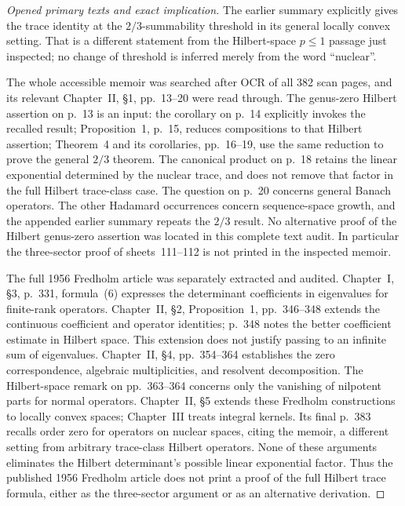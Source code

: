 \begin{proof}[Opened primary texts and exact implication]
The earlier summary \cite[Chapter II, no.~6, Theorem 8 and Corollary 2,
pp.~107--108]{Grothendieck1952Summary} explicitly gives the trace identity
at the $2/3$-summability threshold in its general locally convex setting.
That is a different statement from the Hilbert-space $p\leq1$ passage
just inspected; no change of threshold is inferred merely from the word
``nuclear''.

The whole accessible memoir was searched after OCR of all 382 scan pages,
and its relevant Chapter~II, \S1, pp.~13--20 were read through. The
genus-zero Hilbert assertion on p.~13 is an input: the corollary on p.~14
explicitly invokes the recalled result; Proposition~1, p.~15, reduces
compositions to that Hilbert assertion; Theorem~4 and its corollaries,
pp.~16--19, use the same reduction to prove the general $2/3$ theorem.
The canonical product on p.~18 retains the linear exponential determined
by the nuclear trace, and does not remove that factor in the full
Hilbert trace-class case. The question on p.~20 concerns general Banach
operators. The other Hadamard occurrences concern sequence-space growth,
and the appended earlier summary repeats the $2/3$ result. No alternative
proof of the Hilbert genus-zero assertion was located in this complete
text audit. In particular the three-sector proof of sheets~111--112 is
not printed in the inspected memoir.

The full 1956 Fredholm article was separately extracted and audited.
Chapter~I, \S3, p.~331, formula~(6) expresses the determinant coefficients
in eigenvalues for finite-rank operators. Chapter~II, \S2,
Proposition~1, pp.~346--348 extends the continuous coefficient and
operator identities; p.~348 notes the better coefficient estimate in
Hilbert space. This extension does not justify passing to an infinite
sum of eigenvalues. Chapter~II, \S4, pp.~354--364 establishes the
zero correspondence, algebraic multiplicities, and resolvent
decomposition. The Hilbert-space remark on pp.~363--364 concerns only
the vanishing of nilpotent parts for normal operators. Chapter~II,
\S5 extends these Fredholm constructions to locally convex spaces;
Chapter~III treats integral kernels. Its final p.~383 recalls order
zero for operators on nuclear spaces, citing the memoir, a different
setting from arbitrary trace-class Hilbert operators. None of these
arguments eliminates the Hilbert determinant's possible linear
exponential factor. Thus the published 1956 Fredholm article does not
print a proof of the full Hilbert trace formula, either as the
three-sector argument or as an alternative derivation.


\end{proof}
